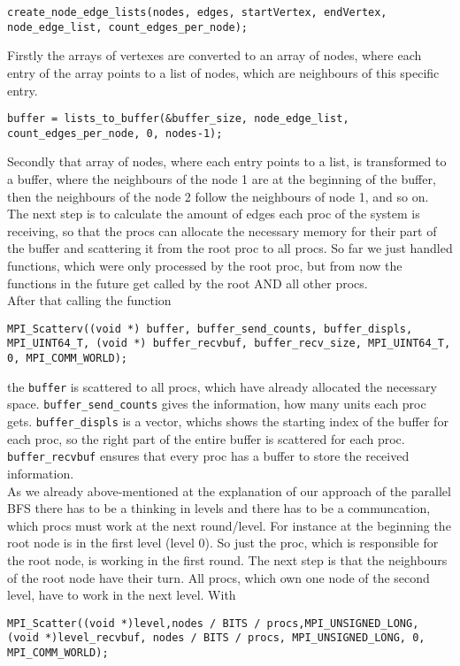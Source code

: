 \documentclass[12pt,a4paper]{article}
\begin{document}
\begin{lstlisting}
create_node_edge_lists(nodes, edges, startVertex, endVertex, node_edge_list, count_edges_per_node);
\end{lstlisting}
Firstly the arrays of vertexes are converted to an array of nodes, where each entry of the array points to a list of nodes, which are neighbours of this specific entry.
\begin{lstlisting}
buffer = lists_to_buffer(&buffer_size, node_edge_list, count_edges_per_node, 0, nodes-1);
\end{lstlisting}
Secondly that array of nodes, where each entry points to a list, is transformed to a buffer, where the neighbours of the node 1 are at the beginning of the buffer, then the neighbours of the node 2 follow the neighbours of node 1, and so on.
The next step is to calculate the amount of edges each proc of the system is receiving, so that the procs can allocate the necessary memory for their part of the buffer and scattering it from the root proc to all procs.  So far we just handled functions, which were only processed by the root proc, but from now the functions in the future get called by the root AND all other procs. \\
After that calling the function
\begin{lstlisting}
MPI_Scatterv((void *) buffer, buffer_send_counts, buffer_displs, MPI_UINT64_T, (void *) buffer_recvbuf, buffer_recv_size, MPI_UINT64_T, 0, MPI_COMM_WORLD);
\end{lstlisting}
the \lstinline{buffer} is scattered to all procs, which have already allocated the necessary space. \lstinline{buffer_send_counts} gives the information, how many units each proc gets. \lstinline{buffer_displs} is a vector, whichs shows the starting index of the buffer for each proc, so the right part of the entire buffer is scattered for each proc. \lstinline{buffer_recvbuf} ensures that every proc has a buffer to store the received information.\\
As we already above-mentioned at the explanation of our approach of the parallel BFS there has to be a thinking in levels and there has to be a communcation, which procs must work at the next round/level. For instance at the beginning the root node is in the first level (level 0). So just the proc, which is responsible for the root node, is working in the first round. The next step is that the neighbours of the root node have their turn. All procs, which own one node of the second level, have to work in the next level. With
\begin{lstlisting}
MPI_Scatter((void *)level,nodes / BITS / procs,MPI_UNSIGNED_LONG, (void *)level_recvbuf, nodes / BITS / procs, MPI_UNSIGNED_LONG, 0, MPI_COMM_WORLD);
\end{lstlisting}
\end{document}
